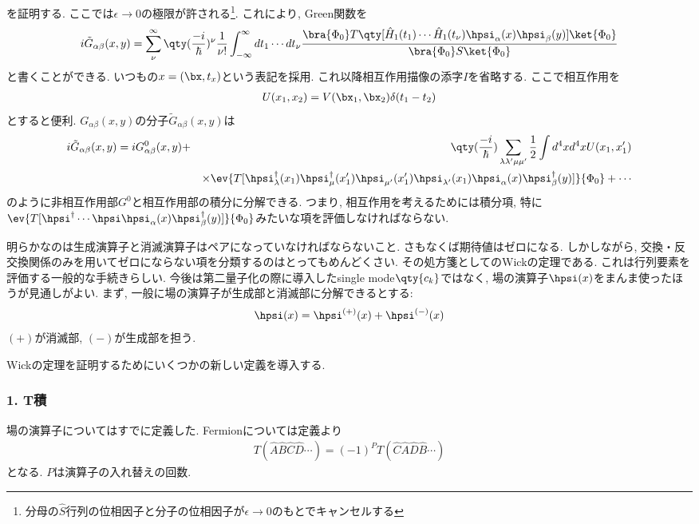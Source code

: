 \documentclass[10.5pt,a4paper]{jreport}
\begin{document}
を証明する. ここでは$\epsilon\rightarrow 0$の極限が許される\footnote{分母の$\hat{S}$行列の位相因子と分子の位相因子が$\epsilon\rightarrow 0$のもとでキャンセルする}. これにより, Green関数を
\begin{eqnarray}
  i\tilde{G}_{\alpha\beta}(x, y) = \sum_\nu^\infty \qty(\frac{-i}{\hbar})^\nu \frac{1}{\nu!}\int_{-\infty}^\infty dt_1\cdots dt_\nu\frac{\bra{\Phi_0}T\qty[\hat{H}_1(t_1)\cdots\hat{H}_1(t_\nu)\hpsi_\alpha(x)\hpsi_\beta(y)]\ket{\Phi_0}}{\bra{\Phi_0}S\ket{\Phi_0}}
\end{eqnarray}
と書くことができる. いつもの$x = (\bx, t_x)$という表記を採用. これ以降相互作用描像の添字$I$を省略する. ここで相互作用を
\begin{eqnarray}
  U(x_1, x_2) = V(\bx_1, \bx_2)\delta(t_1 - t_2)
\end{eqnarray}
とすると便利. $G_{\alpha\beta}(x, y)$の分子$\tilde{G}_{\alpha\beta}(x, y)$は
\begin{eqnarray}
  \nonumber  i\tilde{G}_{\alpha\beta}(x, y) = iG^0_{\alpha\beta}(x, y) &+& \qty(\frac{-i}{\hbar})\sum_{\lambda\lambda'\mu\mu'}\frac{1}{2}\int d^4xd^4x U(x_1, x_1')\\
  &&\times \ev{T[\hpsi_{\lambda}^\dagger(x_1)\hpsi^\dagger_{\mu}(x_1')\hpsi_{\mu'}(x_1')\hpsi_{\lambda'}(x_1)\hpsi_{\alpha}(x)\hpsi^\dagger_{\beta}(y)]}{\Phi_0} + \cdots
\end{eqnarray}
のように非相互作用部$G^0$と相互作用部の積分に分解できる. つまり, 相互作用を考えるためには積分項, 特に$\ev{T[\hpsi^\dagger\cdots\hpsi\hpsi_{\alpha}(x)\hpsi^\dagger_{\beta}(y)]}{\Phi_0}$みたいな項を評価しなければならない.

明らかなのは生成演算子と消滅演算子はペアになっていなければならないこと. さもなくば期待値はゼロになる. しかしながら, 交換・反交換関係のみを用いてゼロにならない項を分類するのはとってもめんどくさい. その処方箋としてのWickの定理である. これは行列要素を評価する一般的な手続きらしい. 今後は第二量子化の際に導入したsingle mode$\qty{c_k}$ではなく, 場の演算子$\hpsi(x)$をまんま使ったほうが見通しがよい. まず, 一般に場の演算子が生成部と消滅部に分解できるとする:
\begin{eqnarray}
  \hpsi(x) = \hpsi^{(+)}(x) + \hpsi^{(-)}(x)
\end{eqnarray}
$(+)$が消滅部, $(-)$が生成部を担う.

Wickの定理を証明するためにいくつかの新しい定義を導入する.

\subsubsection{1. T積}
場の演算子についてはすでに定義した. Fermionについては定義より
\begin{eqnarray}
  T(\hat{A}\hat{B}\hat{C}\hat{D}\cdots) = (-1)^PT(\hat{C}\hat{A}\hat{D}\hat{B}\cdots)
\end{eqnarray}
となる. $P$は演算子の入れ替えの回数. 
\end{document}
